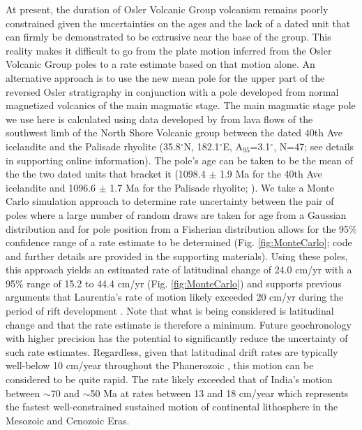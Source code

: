 \documentclass[draft,gc]{AGUTeX}
\begin{document}
\begin{article}
At present, the duration of Osler Volcanic Group volcanism remains poorly constrained given the uncertainties on the ages and the lack of a dated unit that can firmly be demonstrated to be extrusive near the base of the group. This reality makes it difficult to go from the plate motion inferred from the Osler Volcanic Group poles to a rate estimate based on that motion alone. An alternative approach is to use the new mean pole for the upper part of the reversed Osler stratigraphy in conjunction with a pole developed from normal magnetized volcanics of the main magmatic stage. The main magmatic stage pole we use here is calculated using data developed by \cite{Tauxe2009a} from lava flows of the southwest limb of the North Shore Volcanic group between the dated 40th Ave icelandite and the Palisade rhyolite (35.8$^\circ$N, 182.1$^\circ$E, A$_{95}$=3.1$^\circ$, N=47; see details in supporting online information). The pole's age can be taken to be the mean of the the two dated units that bracket it (1098.4 $\pm$ 1.9 Ma for the 40th Ave icelandite and 1096.6 $\pm$ 1.7 Ma for the Palisade rhyolite; \cite{Davis1997a}). We take a Monte Carlo simulation approach to determine rate uncertainty between the pair of poles where a large number of random draws are taken for age from a Gaussian distribution and for pole position from a Fisherian distribution allows for the 95$\%$ confidence range of a rate estimate to be determined  (Fig. \ref{fig:MonteCarlo}; code and further details are provided in the supporting materials). Using these poles, this approach yields an estimated rate of latitudinal change of 24.0 cm/yr with a 95$\%$ range of 15.2 to 44.4 cm/yr (Fig. \ref{fig:MonteCarlo}) and supports previous arguments that Laurentia's rate of motion likely exceeded 20 cm/yr during the period of rift development \citep{Davis1997a,Swanson-Hysell2009a}. Note that what is being considered is latitudinal change and that the rate estimate is therefore a minimum. Future geochronology with higher precision has the potential to significantly reduce the uncertainty of such rate estimates. Regardless, given that latitudinal drift rates are typically well-below 10 cm/year throughout the Phanerozoic \citep{Torsvik2012a}, this motion can be considered to be quite rapid. The rate likely exceeded that of India's motion between $\sim$70 and $\sim$50 Ma at rates between 13 and 18 cm/year which represents the fastest well-constrained sustained motion of continental lithosphere in the Mesozoic and Cenozoic Eras\citep{Hinsbergen2011a, Torsvik2012a}.


\end{article}
\end{document}
